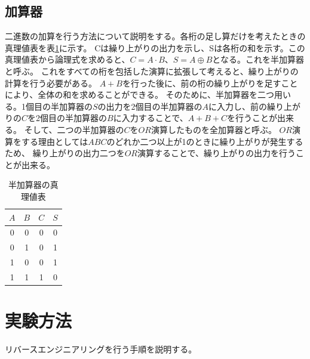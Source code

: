 \documentclass[a4paper,11pt]{ltjsarticle}
\begin{document}
\subsection{加算器}
二進数の加算を行う方法について説明をする。各桁の足し算だけを考えたときの真理値表を表\ref{tab:halfadd}に示す。
Cは繰り上がりの出力を示し、Sは各桁の和を示す。この真理値表から論理式を求めると、$C = A \cdot B$、$S = A \oplus B$となる。これを半加算器と呼ぶ。
これをすべての桁を包括した演算に拡張して考えると、繰り上がりの計算を行う必要がある。
$A+B$を行った後に、前の桁の繰り上がりを足すことにより、全体の和を求めることができる。
そのために、半加算器を二つ用いる。1個目の半加算器の$S$の出力を2個目の半加算器の$A$に入力し、前の繰り上がりの$C$を2個目の半加算器の$B$に入力することで、$A + B + C$を行うことが出来る。
そして、二つの半加算器の$C$を$OR$演算したものを全加算器と呼ぶ。
$OR$演算をする理由としては$A B C$のどれか二つ以上が1のときに繰り上がりが発生するため、
繰り上がりの出力二つを$OR$演算することで、繰り上がりの出力を行うことが出来る。
\begin{table}[htbp]
    \centering
    \caption{半加算器の真理値表}
    \begin{tabular}{|c|c|c|c|}
        \hline
        $A$ & $B$ & $C$ & $S$ \\
        \hline
        0 & 0 & 0 & 0 \\
        0 & 1 & 0 & 1 \\
        1 & 0 & 0 & 1 \\
        1 & 1 & 1 & 0 \\
        \hline
    \end{tabular}
    \label{tab:halfadd}
\end{table}
\section{実験方法}
リバースエンジニアリングを行う手順を説明する。
\end{document}
